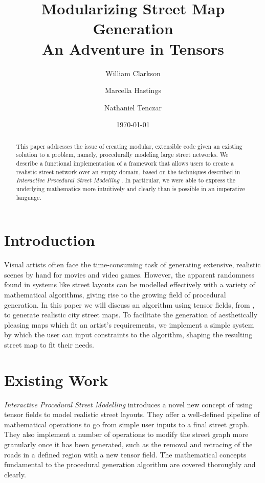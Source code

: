 \documentclass[twocolumn]{article}
\title{Modularizing Street Map Generation \\
    \vspace{8pt} \large An Adventure in Tensors}
\author{William Clarkson \and Marcella Hastings \and Nathaniel Tenczar}
\date{\today}
\begin{document}
\maketitle

\begin{abstract}
This paper addresses the issue of creating modular, extensible code given an
existing solution to a problem, namely, procedurally modeling large street
networks. We describe a functional implementation of a framework that allows
users to create a realistic street network over an empty domain, based on the
techniques described in \textit{Interactive Procedural Street Modelling}
\cite{chen}. In particular, we were able to express the underlying mathematics
more intuitively and clearly than is possible in an imperative language.
\end{abstract}

\section{Introduction}
Visual artists often face the time-consuming task of generating extensive,
realistic scenes by hand for movies and video games. However, the apparent
randomness found in systems like street layouts can be modelled effectively
with a variety of mathematical algorithms, giving rise to the growing field of
procedural generation. In this paper we will discuss an algorithm using tensor
fields, from \cite{chen}, to generate realistic city street maps. To facilitate
the generation of aesthetically pleasing maps which fit an artist's
requirements, we implement a simple system by which the user can input
constraints to the algorithm, shaping the resulting street map to fit their
needs.

\section{Existing Work}
\textit{Interactive Procedural Street Modelling} \cite{chen} introduces a novel
new concept of using tensor fields to model realistic street layouts. They
offer a well-defined pipeline of mathematical operations to go from simple user
inputs to a final street graph. They also implement a number of operations to
modify the street graph more granularly once it has been generated, such as the
removal and retracing of the roads in a defined region with a new
tensor field. The mathematical concepts fundamental to the procedural
generation algorithm are covered thoroughly and clearly.
\end{document}
